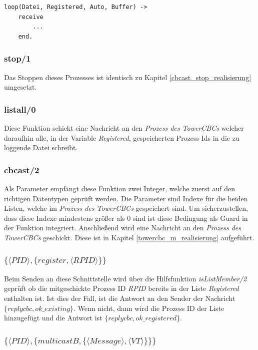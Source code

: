 \begin{lstlisting}
loop(Datei, Registered, Auto, Buffer) ->
    receive
        ...
    end.
\end{lstlisting}

\subsubsection{stop/1}

Das Stoppen dieses Prozesses ist identisch zu Kapitel \ref{cbcast_stop_realisierung} umgesetzt.

\subsubsection{listall/0}

Diese Funktion schickt eine Nachricht an den \textit{Prozess des TowerCBCs} welcher daraufhin alle, in der Variable \textit{Registered}, gespeicherten Prozess Ids in die zu loggende Datei schreibt. 

\subsubsection{cbcast/2}

Als Parameter empfängt diese Funktion zwei Integer, welche zuerst auf den richtigen Datentypen geprüft werden. Die Parameter sind Indexe für die beiden Listen, welche im \textit{Prozess des TowerCBCs} gespeichert sind. Um sicherzustellen, dass diese Indexe mindestens größer als 0 sind ist diese Bedingung als Guard in der Funktion integriert. Anschließend wird eine Nachricht an den \textit{Prozess des TowerCBCs} geschickt. Diese ist in Kapitel \ref{towercbc_m_realisierung} aufgeführt.

\subsubsection{$\{\langle PID \rangle,\{register,\langle RPID\rangle\}\}$} \label{towercbc_register_realisierung}

Beim Senden an diese Schnittstelle wird über die Hilfsfunktion \textit{isListMember/2} geprüft ob die mitgeschickte Prozess ID \textit{RPID} bereits in der Liste \textit{Registered} enthalten ist. Ist dies der Fall, ist die Antwort an den Sender der Nachricht $\{replycbc, ok\_existing\}$. Wenn nicht, dann wird die Prozess ID der Liste hinzugefügt und die Antwort ist $\{replycbc, ok\_registered\}$.

\subsubsection{$\{\langle PID\rangle,\{multicastB,\{\langle Message\rangle,\langle VT\rangle\}\}\}$} \label{towercbc_b_realisierung}

